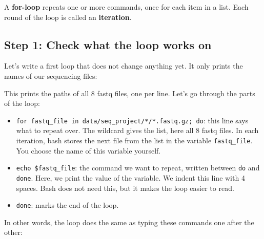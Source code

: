 \documentclass[
  letterpaper,
  DIV=11,
  numbers=noendperiod]{scrreprt}
\newenvironment{Shaded}{}{}
\newcommand{\BuiltInTok}[1]{\textcolor[rgb]{0.84,0.23,0.29}{#1}}
\newcommand{\CommentTok}[1]{\textcolor[rgb]{0.42,0.45,0.49}{#1}}
\newcommand{\ControlFlowTok}[1]{\textcolor[rgb]{0.84,0.23,0.29}{#1}}
\newcommand{\KeywordTok}[1]{\textcolor[rgb]{0.84,0.23,0.29}{#1}}
\newcommand{\NormalTok}[1]{\textcolor[rgb]{0.14,0.16,0.18}{#1}}
\newcommand{\OperatorTok}[1]{\textcolor[rgb]{0.14,0.16,0.18}{#1}}
\newcommand{\PreprocessorTok}[1]{\textcolor[rgb]{0.84,0.23,0.29}{#1}}
\newcommand{\VariableTok}[1]{\textcolor[rgb]{0.89,0.38,0.04}{#1}}
\providecommand{\tightlist}{%
  \setlength{\itemsep}{0pt}\setlength{\parskip}{0pt}}
\begin{document}
A \textbf{for-loop} repeats one or more commands, once for each item in
a list. Each round of the loop is called an \textbf{iteration}.

\subsection{Step 1: Check what the loop works
on}\label{step-1-check-what-the-loop-works-on}

Let's write a first loop that does not change anything yet. It only
prints the names of our sequencing files:

\begin{Shaded}
\end{Shaded}

This prints the paths of all 8 fastq files, one per line. Let's go
through the parts of the loop:

\begin{itemize}
\tightlist
\item
  \texttt{for\ fastq\_file\ in\ data/seq\_project/*/*.fastq.gz;\ do}:
  this line says what to repeat over. The wildcard gives the list, here
  all 8 fastq files. In each iteration, bash stores the next file from
  the list in the variable \texttt{fastq\_file}. You choose the name of
  this variable yourself.
\item
  \texttt{echo\ \$fastq\_file}: the command we want to repeat, written
  between \texttt{do} and \texttt{done}. Here, we print the value of the
  variable. We indent this line with 4 spaces. Bash does not need this,
  but it makes the loop easier to read.
\item
  \texttt{done}: marks the end of the loop.
\end{itemize}

In other words, the loop does the same as typing these commands one
after the other:

\begin{Shaded}
\end{Shaded}
\end{document}
